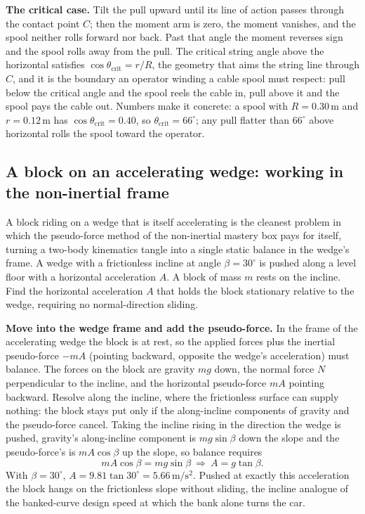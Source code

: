 \textbf{The critical case.} Tilt the pull upward until its line of action
passes through the contact point $C$; then the moment arm is zero, the
moment vanishes, and the spool neither rolls forward nor back. Past that
angle the moment reverses sign and the spool rolls away from the pull.
The critical string angle above the horizontal satisfies $\cos\theta_{
\text{crit}}=r/R$, the geometry that aims the string line through $C$,
and it is the boundary an operator winding a cable spool must respect:
pull below the critical angle and the spool reels the cable in, pull
above it and the spool pays the cable out. Numbers make it concrete: a
spool with $R=0.30\,\si{\meter}$ and $r=0.12\,\si{\meter}$ has
$\cos\theta_{\text{crit}}=0.40$, so $\theta_{\text{crit}}=66^{\circ}$;
any pull flatter than $66^{\circ}$ above horizontal rolls the spool
toward the operator.

\subsection{A block on an accelerating wedge: working in the
non-inertial frame}

A block riding on a wedge that is itself accelerating is the cleanest
problem in which the pseudo-force method of the non-inertial mastery box
pays for itself, turning a two-body kinematics tangle into a single
static balance in the wedge's frame. A wedge with a frictionless incline
at angle $\beta=30^{\circ}$ is pushed along a level floor with a
horizontal acceleration $A$. A block of mass $m$ rests on the incline.
Find the horizontal acceleration $A$ that holds the block stationary
relative to the wedge, requiring no normal-direction sliding.

\textbf{Move into the wedge frame and add the pseudo-force.} In the
frame of the accelerating wedge the block is at rest, so the applied
forces plus the inertial pseudo-force $-mA$ (pointing backward, opposite
the wedge's acceleration) must balance. The forces on the block are
gravity $mg$ down, the normal force $N$ perpendicular to the incline,
and the horizontal pseudo-force $mA$ pointing backward. Resolve along
the incline, where the frictionless surface can supply nothing: the
block stays put only if the along-incline components of gravity and the
pseudo-force cancel. Taking the incline rising in the direction the
wedge is pushed, gravity's along-incline component is $mg\sin\beta$ down
the slope and the pseudo-force's is $mA\cos\beta$ up the slope, so
balance requires
\[
mA\cos\beta=mg\sin\beta \ \Rightarrow\ A=g\tan\beta.
\]
With $\beta=30^{\circ}$, $A=9.81\tan 30^{\circ}=5.66\,\si{\meter\per
\second\squared}$. Pushed at exactly this acceleration the block hangs on
the frictionless slope without sliding, the incline analogue of the
banked-curve design speed at which the bank alone turns the car.

